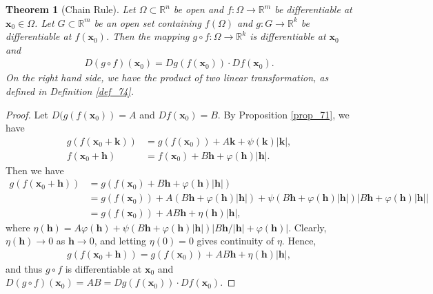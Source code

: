 \documentclass[11pt]{book}
\newtheorem{theorem}{Theorem}[chapter]
\theoremstyle{definition}
\numberwithin{equation}{chapter}
\begin{document}
\medskip

\begin{theorem}[Chain Rule]\label{th_74}
Let $\Omega \subset \mathbb{R}^n$ be open and $f: \Omega \to \mathbb{R}^m$ be differentiable at $\mathbf{x}_0 \in \Omega$. Let $G \subset \mathbb{R}^m$ be an open set containing $f(\Omega)$ and $g: G \to \mathbb{R}^k$ be differentiable at $f(\mathbf{x}_0)$. Then the mapping $g \circ f: \Omega \to \mathbb{R}^k$ is differentiable at $\mathbf{x}_0$ and
\begin{align*}
    D(g \circ f)(\mathbf{x}_0) = Dg(f(\mathbf{x}_0)) \cdot Df(\mathbf{x}_0).
\end{align*}
On the right hand side, we have the product of two linear transformation, as defined in Definition \ref{def_74}.
\end{theorem}
\begin{proof}
Let $D(g(f(\mathbf{x}_0)) = A$ and $Df(\mathbf{x}_0) = B$. By Proposition \ref{prop_71}, we have
\begin{align*}
    g(f(\mathbf{x}_0 + \mathbf{k})) & = g(f(\mathbf{x}_0)) + A \mathbf{k} + \psi(\mathbf{k}) \left|\mathbf{k}\right|, \\
    f(\mathbf{x}_0 + \mathbf{h}) & = f(\mathbf{x}_0) + B \mathbf{h} + \varphi(\mathbf{h}) \left|\mathbf{h}\right|.
\end{align*}
Then we have
\begin{align*}
    g(f(\mathbf{x}_0 + \mathbf{h})) & = g(f(\mathbf{x}_0) + B \mathbf{h} + \varphi(\mathbf{h}) \left|\mathbf{h}\right|) \\
    & = g(f(\mathbf{x}_0)) + A(B \mathbf{h} + \varphi(\mathbf{h}) \left|\mathbf{h}\right|) + \psi(B \mathbf{h} + \varphi(\mathbf{h}) \left|\mathbf{h}\right|) \left|B \mathbf{h} + \varphi(\mathbf{h}) \left|\mathbf{h}\right|\right| \\
    & = g(f(\mathbf{x}_0)) + AB \mathbf{h} + \eta(\mathbf{h}) \left|\mathbf{h}\right|,
\end{align*}
where $\eta(\mathbf{h}) = A \varphi(\mathbf{h}) + \psi(B \mathbf{h} + \varphi(\mathbf{h}) \left|\mathbf{h}\right|) \left|B \mathbf{h}/\left|\mathbf{h}\right| + \varphi(\mathbf{h})\right|$. Clearly, $\eta(\mathbf{h}) \to 0$ as $\mathbf{h} \to 0$, and letting $\eta(0) = 0$ gives continuity of $\eta$. Hence,
\begin{align*}
    g(f(\mathbf{x}_0 + \mathbf{h})) = g(f(\mathbf{x}_0)) + AB \mathbf{h} + \eta(\mathbf{h}) \left|\mathbf{h}\right|,
\end{align*}
and thus $g \circ f$ is differentiable at $\mathbf{x}_0$ and $D(g \circ f)(\mathbf{x}_0) = AB = Dg(f(\mathbf{x}_0)) \cdot Df(\mathbf{x}_0)$.
\end{proof}
\end{document}
